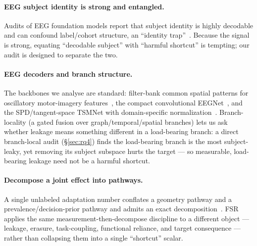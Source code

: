 \paragraph{EEG subject identity is strong and entangled.} Audits of EEG foundation models report that
subject identity is highly decodable and can confound label/cohort structure, an ``identity
trap''~\citep{lin2026identitytrap}. Because the signal is strong, equating ``decodable subject'' with
``harmful shortcut'' is tempting; our audit is designed to separate the two.

\paragraph{EEG decoders and branch structure.} The backbones we analyse are standard: filter-bank
common spatial patterns for oscillatory motor-imagery features~\citep{ang2012fbcsp}, the compact
convolutional EEGNet~\citep{lawhern2018eegnet}, and the SPD/tangent-space TSMNet with domain-specific
normalization~\citep{kobler2022tsmnet}. Branch-locality (a gated fusion over graph/temporal/spatial
branches) lets us ask whether leakage means something different in a load-bearing branch: a direct
branch-local audit (\S\ref{sec:rq4}) finds the load-bearing branch is the most subject-leaky, yet
removing its subject subspace hurts the target --- so measurable, load-bearing leakage need not be a
harmful shortcut.

\paragraph{Decompose a joint effect into pathways.} A single unlabeled adaptation number conflates a
geometry pathway and a prevalence/decision-prior pathway and admits an exact
decomposition~\citep{prior_decoupled_tta_internal}. FSR applies the same measurement-then-decompose
discipline to a different object --- leakage, erasure, task-coupling, functional reliance, and target
consequence --- rather than collapsing them into a single ``shortcut'' scalar.
